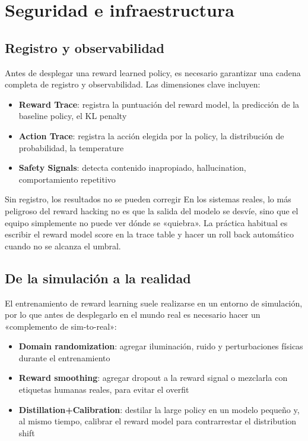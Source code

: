 \section{Seguridad e infraestructura}

\subsection{Registro y observabilidad}

Antes de desplegar una reward learned policy, es necesario garantizar una cadena completa de registro y observabilidad. Las dimensiones clave incluyen:

\begin{itemize}
    \item \textbf{Reward Trace}: registra la puntuación del reward model, la predicción de la baseline policy, el KL penalty
    \item \textbf{Action Trace}: registra la acción elegida por la policy, la distribución de probabilidad, la temperature
    \item \textbf{Safety Signals}: detecta contenido inapropiado, hallucination, comportamiento repetitivo
\end{itemize}

\begin{warningbox}{Sin registro, los resultados no se pueden corregir}
En los sistemas reales, lo más peligroso del reward hacking no es que la salida del modelo se desvíe, sino que el equipo simplemente no puede ver dónde se «quiebra». La práctica habitual es escribir el reward model score en la trace table y hacer un roll back automático cuando no se alcanza el umbral.
\end{warningbox}

\subsection{De la simulación a la realidad}

El entrenamiento de reward learning suele realizarse en un entorno de simulación, por lo que antes de desplegarlo en el mundo real es necesario hacer un «complemento de sim-to-real»:

\begin{itemize}
    \item \textbf{Domain randomization}: agregar iluminación, ruido y perturbaciones físicas durante el entrenamiento
    \item \textbf{Reward smoothing}: agregar dropout a la reward signal o mezclarla con etiquetas humanas reales, para evitar el overfit
    \item \textbf{Distillation+Calibration}: destilar la large policy en un modelo pequeño y, al mismo tiempo, calibrar el reward model para contrarrestar el distribution shift
\end{itemize}

